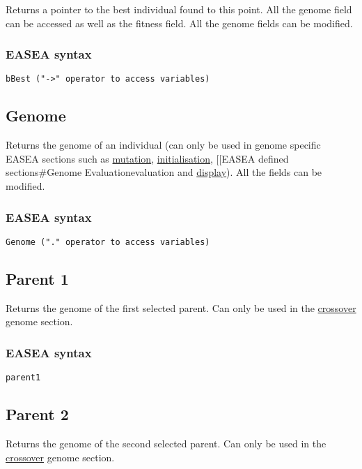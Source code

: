 \documentclass{book}
\begin{document}
Returns a pointer to the best individual found to this point. All the
genome field can be accessed as well as the fitness field. All the
genome fields can be modified.

\subsubsection{EASEA syntax}\label{easea-syntax-9}

\texttt{bBest~("-\textgreater{}"~operator~to~access~variables)}

\subsection{Genome}\label{genome}

Returns the genome of an individual (can only be used in genome specific
EASEA sections such as
\href{EASEA defined sections\#Genome_Mutation}{mutation},
\href{EASEA defined sections\#Genome_Initialiser}{initialisation},
{[}{[}EASEA defined sections\#Genome Evaluation\textbar{}evaluation and
\href{EASEA defined sections\#Genome_Display}{display}). All the fields
can be modified.

\subsubsection{EASEA syntax}\label{easea-syntax-10}

\texttt{Genome~("."~operator~to~access~variables)}

\subsection{Parent 1}\label{parent-1}

Returns the genome of the first selected parent. Can only be used in the
\href{EASEA defined sections\#Genome_Crossover}{crossover} genome
section.

\subsubsection{EASEA syntax}\label{easea-syntax-11}

\texttt{parent1}

\subsection{Parent 2}\label{parent-2}

Returns the genome of the second selected parent. Can only be used in
the \href{EASEA defined sections\#Genome_Crossover}{crossover} genome
section.
\end{document}
